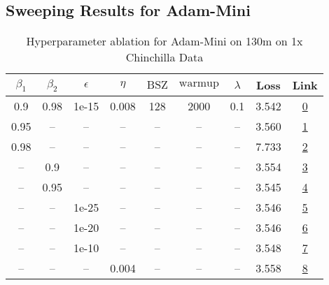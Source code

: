 \subsection{Sweeping Results for Adam-Mini}%
\begin{table}[H]
\centering
\caption{Hyperparameter ablation for Adam-Mini on 130m on 1x Chinchilla Data}
\label{tab:ablation_adam-mini_130m_1}
\begin{tabular}{ccccccccc}
\toprule
$\beta_1$ & $\beta_2$ & $\epsilon$ & $\eta$ & $\mathrm{BSZ}$ & $\mathrm{warmup}$ & $\lambda$ & Loss & Link \\
\midrule
0.9 & 0.98 & 1e-15 & 0.008 & 128 & 2000 & 0.1 & 3.542 & \href{https://wandb.ai/stanford-mercury/optimizer-scaling/runs/sweep-130m-2B-minif4e66flr0.008-wd0.1-minlr0-warmup2000-b10.9-b2-4d3c05}{0} \\
\midrule
0.95 & -- & -- & -- & -- & -- & -- & 3.560 & \href{https://wandb.ai/stanford-mercury/optimizer-scaling/runs/sweep-130m-2B-minia4c40alr0.008-wd0.1-minlr0-warmup2000-b10.95-b-73290f}{1} \\
0.98 & -- & -- & -- & -- & -- & -- & 7.733 & \href{https://wandb.ai/stanford-mercury/optimizer-scaling/runs/sweep-130m-2B-mini59cf9alr0.008-wd0.1-minlr0-warmup2000-b10.98-b-df073b}{2} \\
-- & 0.9 & -- & -- & -- & -- & -- & 3.554 & \href{https://wandb.ai/stanford-mercury/optimizer-scaling/runs/sweep-130m-2B-mini84080dlr0.008-wd0.1-minlr0-warmup2000-b10.9-b2-d74517}{3} \\
-- & 0.95 & -- & -- & -- & -- & -- & 3.545 & \href{https://wandb.ai/stanford-mercury/optimizer-scaling/runs/sweep-130m-2B-minic9835clr0.008-wd0.1-minlr0-warmup2000-b10.9-b2-d57aa7}{4} \\
-- & -- & 1e-25 & -- & -- & -- & -- & 3.546 & \href{https://wandb.ai/stanford-mercury/optimizer-scaling/runs/sweep-130m-2B-mini510347lr0.008-wd0.1-minlr0-warmup2000-b10.9-b2-9a27cf}{5} \\
-- & -- & 1e-20 & -- & -- & -- & -- & 3.546 & \href{https://wandb.ai/stanford-mercury/optimizer-scaling/runs/sweep-130m-2B-mini6d8617lr0.008-wd0.1-minlr0-warmup2000-b10.9-b2-7a2d5e}{6} \\
-- & -- & 1e-10 & -- & -- & -- & -- & 3.548 & \href{https://wandb.ai/stanford-mercury/optimizer-scaling/runs/sweep-130m-2B-mini845331lr0.008-wd0.1-minlr0-warmup2000-b10.9-b2-fadab9}{7} \\
-- & -- & -- & 0.004 & -- & -- & -- & 3.558 & \href{https://wandb.ai/stanford-mercury/optimizer-scaling/runs/sweep-130m-2B-mini08c39flr0.004-wd0.1-minlr0-warmup2000-b10.9-b2-1b064a}{8} \\

\end{tabular}
\end{table}
